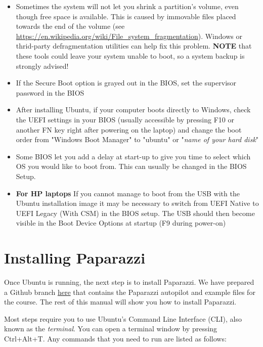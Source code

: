 \begin{itemize}
  \item Sometimes the system will not let you shrink a partition's volume, even though free space is available. This is caused by immovable files placed towards the end of the volume (see \url{https://en.wikipedia.org/wiki/File\_system\_fragmentation}). Windows or thrid-party defragmentation utilities can help fix this problem. \textbf{NOTE} that these tools could leave your system unable to boot, so a system backup is strongly advised!
  
  \item If the Secure Boot option is grayed out in the BIOS, set the supervisor password in the BIOS
  
  \item After installing Ubuntu, if your computer boots directly to Windows, check the UEFI settings in your BIOS (usually accessible by pressing F10 or another FN key right after powering on the laptop) and change the boot order from "Windows Boot Manager" to "ubuntu" or "\textit{name of your hard disk}"
  
  \item Some BIOS let you add a delay at start-up to give you time to select which OS you would like to boot from. This can usually be changed in the BIOS Setup.
  
  \item \textbf{For HP laptops} If you cannot manage to boot from the USB with the Ubuntu installation image it may be necessary to switch from UEFI Native to UEFI Legacy (With CSM) in the BIOS setup. The USB should then become visible in the Boot Device Options at startup (F9 during power-on)
\end{itemize}


\section{Installing Paparazzi}\label{sec:install}
Once Ubuntu is running, the next step is to install Paparazzi.
We have prepared a Github branch \href{https://github.com/tudelft/paparazzi/tree/mavlabCourse2021}{here} that contains the Paparazzi autopilot and example files for the course. The rest of this manual will show you how to install Paparazzi.

Most steps require you to use Ubuntu's Command Line Interface (CLI), also known as the \emph{terminal}. You can open a terminal window by pressing Ctrl+Alt+T. Any commands that you need to run are listed as follows:

